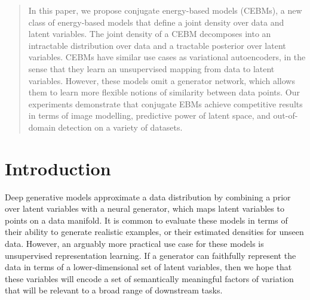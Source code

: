 \documentclass{article}
\begin{document}
\begin{abstract}
In this paper, we propose conjugate energy-based models (CEBMs), a new class of energy-based models that define a joint density over data and latent variables. The joint density of a CEBM decomposes into an intractable distribution over data and a tractable posterior over latent variables. CEBMs have similar use cases as variational autoencoders, in the sense that they learn an unsupervised mapping from data to latent variables. However, these models omit a generator network, which allows them to learn more flexible notions of similarity between data points. Our experiments demonstrate that conjugate EBMs achieve competitive results in terms of image modelling, predictive power of latent space, and out-of-domain detection on a variety of datasets. 
\end{abstract}

\vspace{-1.5\baselineskip}
\section{Introduction}
\label{sec:intro}




Deep generative models approximate a data distribution by combining a prior over latent variables with a neural generator, which maps latent variables to points on a data manifold. It is common to evaluate these models in terms of their ability to generate realistic examples, or their estimated densities for unseen data. However, an arguably more practical use case for these models is unsupervised representation learning. If a generator can faithfully represent the data in terms of a lower-dimensional set of latent variables, then we hope that these variables will encode a set of semantically meaningful factors of variation that will be relevant to a broad range of downstream tasks.
\end{document}
